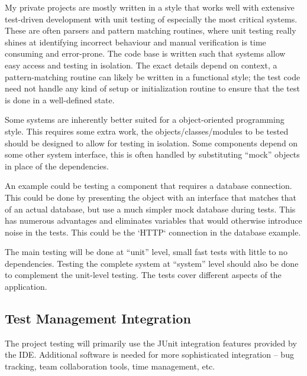 My private projects are mostly written in a style that works well with
extensive test-driven development with unit testing of especially the most
critical systems. These are often parsers and pattern matching routines, where
unit testing really shines at identifying incorrect behaviour and manual
verification is time consuming and error-prone. The code base is written such
that systems allow easy access and testing in isolation. The exact details
depend on context, a pattern-matching routine can likely be written in a
functional style; the test code need not handle any kind of setup or
initialization routine to ensure that the test is done in a well-defined state. 

Some systems are inherently better suited for a object-oriented programming
style.  This requires some extra work, the objects/classes/modules to be tested
should be designed to allow for testing in isolation. Some components depend on
some other system interface, this is often handled by substituting ``mock''
objects in place of the dependencies. 

An example could be testing a component that requires a database connection.
This could be done by presenting the object with an interface that matches that
of an actual database, but use a much simpler mock database during tests. This
has numerous advantages and eliminates variables that would otherwise introduce
noise in the tests. This could be the `HTTP` connection in the database
example.


The main testing will be done at ``unit'' level, small fast tests with little
to no dependencies.  Testing the complete system at ``system'' level should
also be done to complement the unit-level testing. The tests cover different
aspects of the application.





\subsection{Test Management Integration}
The project testing will primarily use the JUnit integration features provided by the IDE.
Additional software is needed for more sophisticated integration -- bug
tracking, team collaboration tools, time management, etc.



